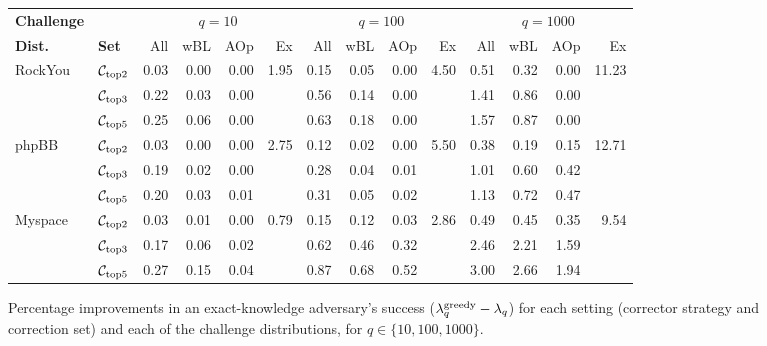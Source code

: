 

\begin{figure*}[t]
\centering
\gamesfontsize
\begin{tabular}[t]{ll*{4}{r}|*{4}r|*{4}{r}}
    \toprule
     \textbf{Challenge}  && \multicolumn{4}{c|}{$q=10$} & \multicolumn{4}{c|}{$q=100$} & \multicolumn{4}{c}{$q=1000$} \\
  
    \textbf{Dist.} & \textbf{Set} &  \textsf{All} & \textsf{wBL} & \textsf{AOp} & \textsf{Ex} & \textsf{All} & \textsf{wBL} & \textsf{AOp} & \textsf{Ex} & \textsf{All} & \textsf{wBL}  & \textsf{AOp} & \textsf{Ex} \\
    \midrule
    \multirow{3}{*}{RockYou} 
  & ${\mathcal C}_{\textrm{top2}}$    & 0.03 &  0.00 & 0.00 & \multirow{3}{*}{1.95} & 0.15 & 0.05 & 0.00 &\multirow{3}{*}{4.50}& 0.51 &  0.32 & 0.00 & \multirow{3}{*}{11.23} \\
  & ${\mathcal C}_{\textrm{top3}}$  & 0.22 & 0.03 & 0.00 && 0.56 & 0.14 & 0.00 && 1.41 & 0.86 & 0.00 \\ 
  & ${\mathcal C}_{\textrm{top5}}$   & 0.25 & 0.06 & 0.00 && 0.63 & 0.18 & 0.00 && 1.57 & 0.87 & 0.00 \\\midrule
  
  \multirow{3}{*}{phpBB} 
  & ${\mathcal C}_{\textrm{top2}}$    & 0.03 & 0.00 & 0.00 &  \multirow{3}{*}{2.75} & 0.12 & 0.02 & 0.00 & \multirow{3}{*}{5.50} & 0.38 & 0.19 & 0.15 & \multirow{3}{*}{12.71} \\
  & ${\mathcal C}_{\textrm{top3}}$  & 0.19 & 0.02 & 0.00 && 0.28 & 0.04 & 0.01 && 1.01 & 0.60 & 0.42\\
  & ${\mathcal C}_{\textrm{top5}}$   & 0.20 & 0.03 & 0.01 && 0.31 & 0.05 & 0.02 && 1.13 & 0.72 & 0.47 \\\midrule

    \multirow{3}{*}{Myspace} 
  & ${\mathcal C}_{\textrm{top2}}$     & 0.03 & 0.01 & 0.00 & \multirow{3}{*}{0.79} & 0.15 & 0.12 & 0.03 & \multirow{3}{*}{2.86} & 0.49 &  0.45 & 0.35 & \multirow{3}{*}{9.54}\\
  & ${\mathcal C}_{\textrm{top3}}$  & 0.17 & 0.06 & 0.02  && 0.62 & 0.46 & 0.32 && 2.46 & 2.21 & 1.59\\
  & ${\mathcal C}_{\textrm{top5}}$   & 0.27 & 0.15 & 0.04  && 0.87 & 0.68 & 0.52 && 3.00 & 2.66 & 1.94\\\bottomrule
  \end{tabular}

  \caption{Percentage improvements in an exact-knowledge adversary's success
    ($\lambda^\textnormal{greedy}_q-\lambda_q$) for each setting (corrector strategy and correction
    set) and each of the challenge distributions, for $q \in \{10, 100, 1000\}$.}
  \label{fig:compare-sets-security}
\end{figure*}



